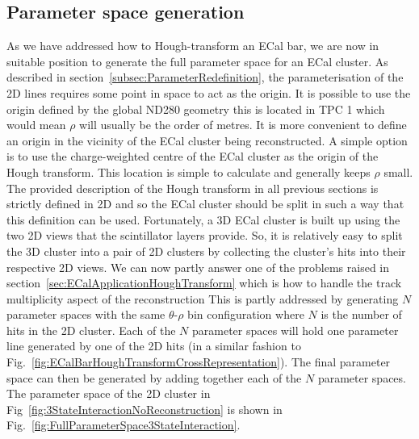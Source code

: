 \subsection{Parameter space generation}
\label{subsec:ParameterSpaceGeneration}
As we have addressed how to Hough-transform an ECal bar, we are now in suitable position to generate the full parameter space for an ECal cluster.  As described in section~\ref{subsec:ParameterRedefinition}, the parameterisation of the 2D lines requires some point in space to act as the origin.  It is possible to use the origin defined by the global ND280 geometry this is located in TPC 1 which would mean $\rho$ will usually be  the order of metres.  It is more convenient to define an origin in the vicinity of the ECal cluster being reconstructed.  A simple option is to use the charge-weighted centre of the ECal cluster as the origin of the Hough transform.  This location is simple to calculate and generally keeps $\rho$ small.
\newline
\newline
The provided description of the Hough transform in all previous sections is strictly defined in 2D and so the ECal cluster should be split in such a way that this definition can be used.  Fortunately, a 3D ECal cluster is built up using the two 2D views that the scintillator layers provide.  So, it is relatively easy to split the 3D cluster into a pair of 2D clusters by collecting the cluster's hits into their respective 2D views.
\newline
\newline
We can now partly answer one of the problems raised in section~\ref{sec:ECalApplicationHoughTransform} which is how to handle the track multiplicity aspect of the reconstruction This is partly addressed by generating $N$ parameter spaces with the same $\theta$-$\rho$ bin configuration where $N$ is the number of hits in the 2D cluster.  Each of the $N$ parameter spaces will hold one parameter line generated by one of the 2D hits (in a similar fashion to Fig.~\ref{fig:ECalBarHoughTransformCrossRepresentation}).  The final parameter space can then be generated by adding together each of the $N$ parameter spaces.  The parameter space of the 2D cluster in Fig~\ref{fig:3StateInteractionNoReconstruction} is shown in Fig.~\ref{fig:FullParameterSpace3StateInteraction}.
